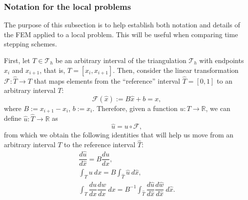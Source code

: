 \documentclass{sfuthesis}
\numberwithin{equation}{section}
\numberwithin{figure}{chapter}
\numberwithin{table}{chapter}
\theoremstyle{definition}
\newcommand{\der}[2]{\dfrac{d #1}{d #2}}
\newcommand{\R}{\mathbb{R}}
\begin{document}
\subsubsection*{Notation for the local problems}

The purpose of this subsection is to help establish both notation and details of the FEM applied to a local problem. This will be useful when comparing time stepping schemes.

First, let $T \in \mathcal{T}_h$ be an arbitrary interval of the triangulation $\mathcal{T}_h$ with endpoints $x_i$ and $x_{i+1}$, that is, $T = [x_i,x_{i+1}]$. Then, consider the linear transformation $\mathcal{F}:\widehat{T} \to T$ that maps elements from the ``reference'' interval $\widehat{T}=[0,1]$ to an arbitrary interval $T$:
\begin{equation}
    \mathcal{F}(\widehat{x}) := B\widehat{x} + b = x,
\end{equation}
where $B := x_{i+1}-x_i$, $b := x_i$. Therefore, given a function $u:T \to \R$, we can define $\widehat{u}:\widehat{T}\to\R$ as
\[
    \widehat{u} = u \circ \mathcal{F},
\]
from which we obtain the following identities that will help us move from an arbitrary interval $T$ to the reference interval $\widehat{T}$:
\begin{subequations}
    \begin{gather}
        \label{eq:du_hat_dx_hat_identity}\der{\widehat{u}}{\widehat{x}} = B \der{u}{x}, \\
        \int_T u \ dx  = B \int_{\widehat{T}} \widehat{u} \ d\widehat{x}, \\
        \int_T \der{u}{x} \der{w}{x} \ dx = B^{-1} \int_{\widehat{T}} \der{\widehat{u}}{\widehat{x}} \der{\widehat{w}}{\widehat{x}} \ d\widehat{x}.
    \end{gather}
\end{subequations}
\end{document}
